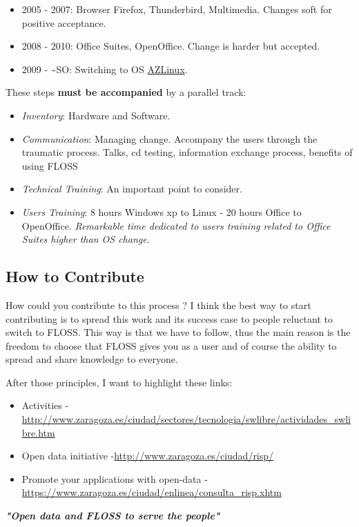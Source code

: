 \begin{itemize}
	\item 2005 - 2007: Browser Firefox, Thunderbird, Multimedia. Changes soft for positive acceptance.
	\item 2008 - 2010: Office Suites, OpenOffice. Change is harder but accepted.
	\item 2009 - \textasciitilde SO: Switching to OS \href{http://zaragozaciudad.net/azlinux/}{AZLinux}.
\end{itemize} These steps \textbf{must be accompanied} by a parallel track:
\begin{itemize}
	\item \textit{Inventory}: Hardware and Software.
	\item \textit{Communication}: Managing change. Accompany the users through the traumatic process. Talks, cd testing, information exchange process, benefits of using FLOSS
	\item \textit{Technical Training}: An important point to consider.
	\item \textit{Users Training}: 8 hours Windows xp to Linux - 20 hours Office to OpenOffice. \textit{Remarkable time dedicated to users training related to Office Suites higher than OS change}.
\end{itemize}

\subsection{How to Contribute}

\par How could you contribute to this process ? I think the best way to start contributing is to spread this work and its success case to people reluctant to switch to FLOSS. This way is that we have to follow, thus the main reason is the freedom to choose that FLOSS gives you as a user and of course the ability to spread and share knowledge to everyone.

\par After those principles, I want to highlight these links:

\begin{itemize}
	\item Activities -\href{http://www.zaragoza.es/ciudad/sectores/tecnologia/swlibre/actividades_swlibre.htm}{http://www.zaragoza.es/ciudad/sectores/tecnologia/swlibre/actividades\_swlibre.htm}
	\item Open data initiative -\href{http://www.zaragoza.es/ciudad/risp/}{http://www.zaragoza.es/ciudad/risp/}
	\item Promote your applications with open-data -\href{https://www.zaragoza.es/ciudad/enlinea/consulta_risp.xhtm}{https://www.zaragoza.es/ciudad/enlinea/consulta\_risp.xhtm}
\end{itemize}\textit{\textbf{"Open data and FLOSS to serve the people"}}

